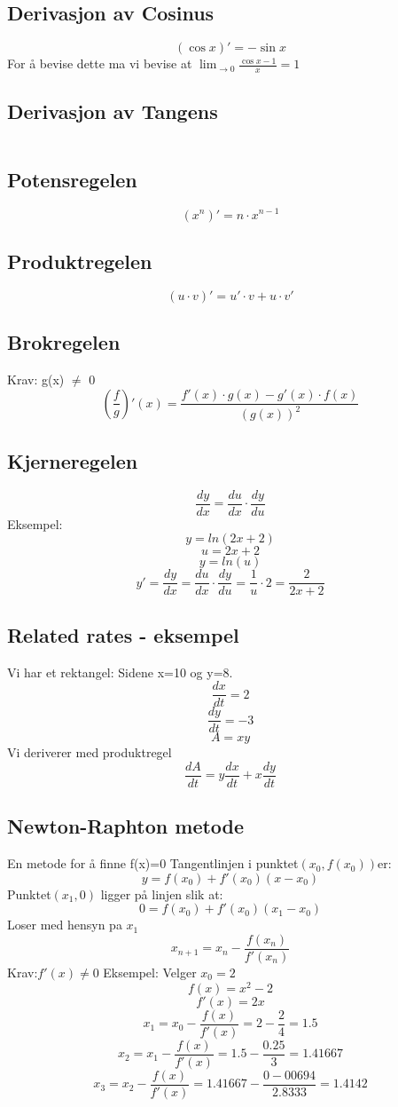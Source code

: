 \documentclass[12pt]{article}
\begin{document}
\subsection*{Derivasjon av Cosinus}
\[(\cos x)'=-\sin x\]
For å bevise dette ma vi bevise at $\lim_{\to0}\frac{\cos x -1}{x}=1$
\subsection*{Derivasjon av Tangens}
\[\]
\subsection*{Potensregelen}
\[(x^n)' = n \cdot x^{n-1}\]
\subsection*{Produktregelen}
\[(u\cdot v)' = u' \cdot v + u\cdot v'\]
\subsection*{Brokregelen}
Krav: g(x) $\neq$ 0
\[(\frac{f}{g})'(x) = \frac{f'(x)\cdot g(x) - g'(x) \cdot f(x)}{(g(x))^2}\]
\subsection*{Kjerneregelen}
\[\frac{dy}{dx}=\frac{du}{dx}\cdot\frac{dy}{du}\]
Eksempel:
\[y=ln(2x+2)\]
\[u=2x+2\]
\[y=ln(u)\]
\[y'=\frac{dy}{dx}=\frac{du}{dx}\cdot\frac{dy}{du}=\frac{1}{u}\cdot2=\frac{2}{2x+2}\]
\subsection*{Related rates - eksempel}
Vi har et rektangel:
Sidene x=10 og y=8.
\[\frac{dx}{dt}=2\]
\[\frac{dy}{dt}=-3\]
\[A=xy\]
Vi deriverer med produktregel
\[\frac{dA}{dt}=y\frac{dx}{dt}+x\frac{dy}{dt}\]
\subsection*{Newton-Raphton metode}
En metode for å finne f(x)=0
\newline Tangentlinjen i punktet$(x_0,f(x_0))$er:
\[y=f(x_0)+f'(x_0)(x-x_0)\]
Punktet$(x_1,0)$ ligger på linjen slik at:
\[0=f(x_0)+f'(x_0)(x_1-x_0)\]
Loser med hensyn pa $x_1$
\[x_{n+1}=x_n-\frac{f(x_n)}{f'(x_n)}\]
Krav:$f'(x)\neq 0$
\newline Eksempel:
\newline Velger $x_0 = 2$
\[f(x)=x^2-2\]
\[f'(x)=2x\]
\[x_1=x_0-\frac{f(x)}{f'(x)}=2-\frac{2}{4}=1.5\]
\[x_2=x_1-\frac{f(x)}{f'(x)}=1.5-\frac{0.25}{3}=1.41667\]
\[x_3=x_2-\frac{f(x)}{f'(x)}=1.41667-\frac{0-00694}{2.8333}=1.4142\]
\end{document}
